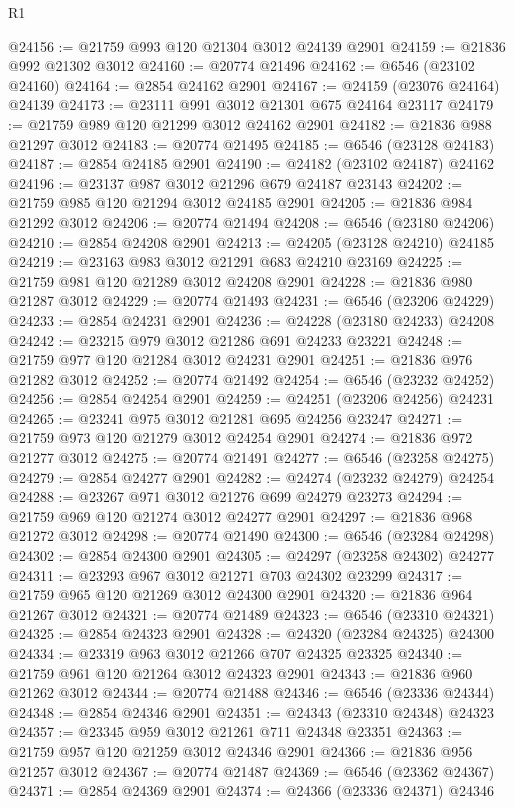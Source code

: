 \begin{lexlean}{R1}
\begin{coremodule}
@24156 := @21759 @993 @120 @21304 @3012 @24139 @2901
@24159 := @21836 @992 @21302 @3012
@24160 := @20774 @21496
@24162 := @6546 (@23102 @24160)
@24164 := @2854 @24162 @2901
@24167 := @24159 (@23076 @24164) @24139
@24173 := @23111 @991 @3012 @21301 @675 @24164 @23117
@24179 := @21759 @989 @120 @21299 @3012 @24162 @2901
@24182 := @21836 @988 @21297 @3012
@24183 := @20774 @21495
@24185 := @6546 (@23128 @24183)
@24187 := @2854 @24185 @2901
@24190 := @24182 (@23102 @24187) @24162
@24196 := @23137 @987 @3012 @21296 @679 @24187 @23143
@24202 := @21759 @985 @120 @21294 @3012 @24185 @2901
@24205 := @21836 @984 @21292 @3012
@24206 := @20774 @21494
@24208 := @6546 (@23180 @24206)
@24210 := @2854 @24208 @2901
@24213 := @24205 (@23128 @24210) @24185
@24219 := @23163 @983 @3012 @21291 @683 @24210 @23169
@24225 := @21759 @981 @120 @21289 @3012 @24208 @2901
@24228 := @21836 @980 @21287 @3012
@24229 := @20774 @21493
@24231 := @6546 (@23206 @24229)
@24233 := @2854 @24231 @2901
@24236 := @24228 (@23180 @24233) @24208
@24242 := @23215 @979 @3012 @21286 @691 @24233 @23221
@24248 := @21759 @977 @120 @21284 @3012 @24231 @2901
@24251 := @21836 @976 @21282 @3012
@24252 := @20774 @21492
@24254 := @6546 (@23232 @24252)
@24256 := @2854 @24254 @2901
@24259 := @24251 (@23206 @24256) @24231
@24265 := @23241 @975 @3012 @21281 @695 @24256 @23247
@24271 := @21759 @973 @120 @21279 @3012 @24254 @2901
@24274 := @21836 @972 @21277 @3012
@24275 := @20774 @21491
@24277 := @6546 (@23258 @24275)
@24279 := @2854 @24277 @2901
@24282 := @24274 (@23232 @24279) @24254
@24288 := @23267 @971 @3012 @21276 @699 @24279 @23273
@24294 := @21759 @969 @120 @21274 @3012 @24277 @2901
@24297 := @21836 @968 @21272 @3012
@24298 := @20774 @21490
@24300 := @6546 (@23284 @24298)
@24302 := @2854 @24300 @2901
@24305 := @24297 (@23258 @24302) @24277
@24311 := @23293 @967 @3012 @21271 @703 @24302 @23299
@24317 := @21759 @965 @120 @21269 @3012 @24300 @2901
@24320 := @21836 @964 @21267 @3012
@24321 := @20774 @21489
@24323 := @6546 (@23310 @24321)
@24325 := @2854 @24323 @2901
@24328 := @24320 (@23284 @24325) @24300
@24334 := @23319 @963 @3012 @21266 @707 @24325 @23325
@24340 := @21759 @961 @120 @21264 @3012 @24323 @2901
@24343 := @21836 @960 @21262 @3012
@24344 := @20774 @21488
@24346 := @6546 (@23336 @24344)
@24348 := @2854 @24346 @2901
@24351 := @24343 (@23310 @24348) @24323
@24357 := @23345 @959 @3012 @21261 @711 @24348 @23351
@24363 := @21759 @957 @120 @21259 @3012 @24346 @2901
@24366 := @21836 @956 @21257 @3012
@24367 := @20774 @21487
@24369 := @6546 (@23362 @24367)
@24371 := @2854 @24369 @2901
@24374 := @24366 (@23336 @24371) @24346

\end{coremodule}
\end{lexlean}
